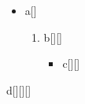 \documentclass{article}
\begin{document}
\makeatletter
\begin{itemize}\item a[\the\@listdepth] \begin{enumerate}\item b[\the\@listdepth][\the\@enumdepth]
\begin{itemize}\item c[\the\@listdepth][\the\@itemdepth]\end{itemize}\end{enumerate}\end{itemize}
d[\the\@listdepth][\the\@itemdepth][\the\@enumdepth]
\makeatother
\end{document}
